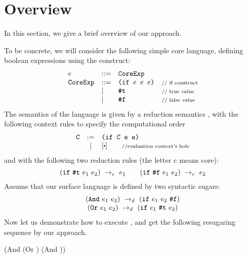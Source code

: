 \section{Overview}
\label{sec2}


In this section, we give a brief overview of our approach. 

To be concrete, we will consider the following simple core language, defining boolean expressions using the  construct:
\[
\begin{array}{lllll}
e &::=& \mbox{\tt CoreExp}\\
\mbox{\tt CoreExp} &::=& \texttt{(if~$e$~$e$~$e$)} &\mbox{{\scriptsize // if construct}}\\
& |& \mbox{\tt \#t}  & \mbox{{\scriptsize // true value}}\\
& |& \mbox{\tt \#f} & \mbox{{\scriptsize // false value}}
\end{array}
\]
The semantics of the language is given by a reduction semantics \cite{reduction}, with the following context rules to specify the computational order
\[
\begin{array}{lcl}
\m{C} &:=& \Code{(if C e e)}\\
&|&[\bigcdot] \qquad \note{//evaluation context's hole}\\
\end{array}
\]
and with the following two reduction rules (the letter c means core):
\[
\centering
 \redc{(\m{if}~\m{\true}~e_1~e_2)}{e_1}  \qquad \redc{(\m{if}~\m{\false}~e_1~e_2)}{e_2}
\]
Assume that our surface language is defined by two syntactic sugars:
\[
\begin{array}{c}
(\mbox{\tt And}~e_1~e_2) ~\rightarrow_d~ (\mbox{\tt if}~e_1~e_2~\mbox{\tt \#f})\\
(\mbox{\tt Or}~e_1~e_2) ~\rightarrow_d~ (\mbox{\tt if}~e_1~\mbox{\tt \#t}~e_2)
\end{array}
\]
Now let us demonstrate how to execute , and get the following resugaring sequence by our approach.
{\small
\begin{Codes}
    (And (Or \true \false) (And \false \true))
\end{Codes}
}

